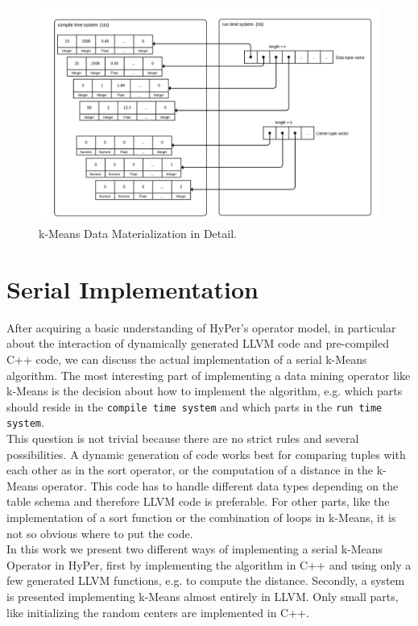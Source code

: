 \begin{figure}[htsb]
  \centering
  \includegraphics[scale=0.25]{figures/mat3}
  \caption[k-Means Data Materialization in Detail]{k-Means Data Materialization in Detail.}
  \label{fig:mat3}
\end{figure}




\section{Serial Implementation}

After acquiring a basic understanding of HyPer’s operator model, in particular about the interaction of dynamically generated LLVM code and pre-compiled C++ code, we can discuss the actual implementation of a serial k-Means algorithm. The most interesting part of implementing a data mining operator like k-Means is the decision about how to implement the algorithm, e.g. which parts should reside in the \texttt{compile time system} and which parts in the \texttt{run time system}. 
\\
This question is not trivial because there are no strict rules and several possibilities. A dynamic generation of code works best for comparing tuples with each other as in the sort operator, or the computation of a distance in the k-Means operator. This code has to handle different data types depending on the table schema and therefore LLVM code is preferable. For other parts, like the implementation of a sort function or the combination of loops in k-Means, it is not so obvious where to put the code.
\\
In this work we present two different ways of implementing a serial k-Means Operator in HyPer, first by implementing the algorithm in C++ and using only a few generated LLVM functions, e.g. to compute the distance. Secondly, a system is presented implementing k-Means almost entirely in LLVM. Only small parts, like initializing the random centers are implemented in C++.



